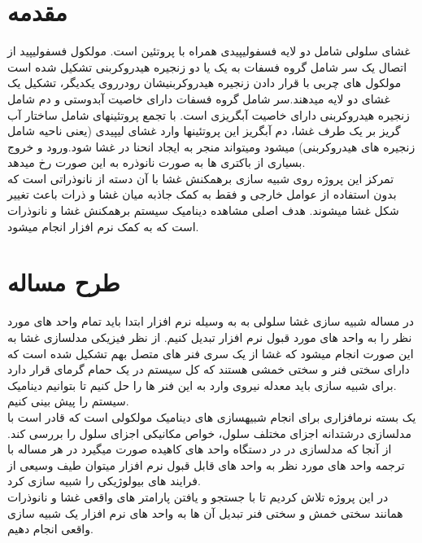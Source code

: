 \documentclass[12pt,onecolumn,a4paper]{report}
\begin{document}
\section{\LARGE{مقدمه} }
{\large{غشای سلولی شامل دو لایه فسفولیپیدی همراه با پروتئین است. مولکول فسفولیپید از اتصال یک سر شامل گروه فسفات
به یک یا دو زنجیره هیدروکربنی تشکیل شده است
مولکول های چربی با قرار دادن زنجیره هیدروکربنیشان
رودرروی یکدیگر، تشکیل یک غشای دو لایه میدهند.سر شامل گروه فسفات دارای خاصیت آبدوستی و دم شامل زنجیره هیدروکربنی دارای خاصیت
آبگریزی است. با تجمع پروتئینهای شامل ساختار
آب گریز بر یک طرف غشا، دم آبگریز این پروتئینها وارد غشای لیپیدی (یعنی ناحیه
شامل زنجیره های هیدروکربنی) میشود ومیتواند منجر به ایجاد
انحنا در غشا شود.ورود و خروج بسیاری از باکتری ها به صورت نانوذره به این صورت رخ میدهد.\\
تمرکز این پروژه روی شبیه سازی برهمکنش غشا با آن دسته از نانوذراتی است که بدون استفاده از عوامل خارجی و فقط به کمک جاذبه میان غشا و ذرات باعث تغییر شکل غشا میشوند.
هدف اصلی مشاهده دینامیک سیستم برهمکنش غشا و نانوذرات است که به کمک نرم افزار  انجام میشود.}

\section{طرح مساله}
در مساله شبیه سازی غشا سلولی به به وسیله نرم افزار ابتدا باید تمام واحد های مورد نظر را به واحد های مورد قبول نرم افزار تبدیل کنیم. از نظر فیزیکی مدلسازی غشا به این صورت انجام میشود که غشا از یک سری فنر های متصل  بهم تشکیل شده است که دارای سختی فنر و سختی خمشی هستند که کل سیستم در یک حمام گرمای قرار دارد .برای شبیه سازی باید معدله نیروی وارد به این فنر ها را حل کنیم تا بتوانیم دینامیک سیستم را پیش بینی کنیم.\\

 یک بسته نرمافزاری برای انجام شبیهسازی های دینامیک مولکولی است که قادر است
با مدلسازی درشتدانه اجزای مختلف سلول، خواص مکانیکی اجزای سلول را بررسی کند.
از آنجا که مدلسازی در در دستگاه واحد های کاهیده صورت میگیرد در هر مساله با ترجمه واحد های مورد نظر به واحد های قابل قبول نرم افزار میتوان طیف وسیعی از فرایند های بیولوژیکی را شبیه سازی کرد.\\
در این پروژه تلاش کردیم تا با جستجو و یافتن پارامتر های واقعی غشا و نانوذرات همانند سختی خمش و سختی فنر  تبدیل آن ها به واحد های نرم افزار یک شبیه سازی واقعی انجام دهیم.

}
\end{document}
